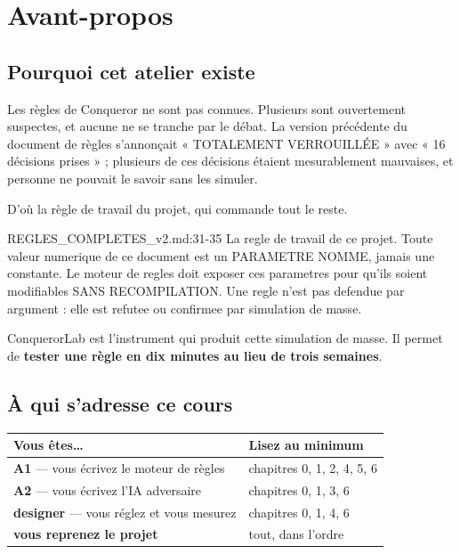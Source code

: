 \chapter{Avant-propos}

\section{Pourquoi cet atelier existe}

Les règles de Conqueror ne sont pas connues. Plusieurs sont ouvertement
suspectes, et aucune ne se tranche par le débat. La version précédente du
document de règles s'annonçait « TOTALEMENT VERROUILLÉE » avec « 16 décisions
prises » ; plusieurs de ces décisions étaient mesurablement mauvaises, et
personne ne pouvait le savoir sans les simuler.

D'où la règle de travail du projet, qui commande tout le reste.

\begin{nkcode}{REGLES\_COMPLETES\_v2.md:31-35}
La regle de travail de ce projet. Toute valeur numerique de ce document est
un PARAMETRE NOMME, jamais une constante. Le moteur de regles doit exposer
ces parametres pour qu'ils soient modifiables SANS RECOMPILATION. Une regle
n'est pas defendue par argument : elle est refutee ou confirmee par
simulation de masse.
\end{nkcode}

ConquerorLab est l'instrument qui produit cette simulation de masse. Il permet
de \textbf{tester une règle en dix minutes au lieu de trois semaines}.

\section{À qui s'adresse ce cours}

\begin{center}
\begin{tabular}{@{}p{6.4cm}p{7.4cm}@{}}
\toprule
\textbf{Vous êtes\ldots} & \textbf{Lisez au minimum} \\
\midrule
\textbf{A1} — vous écrivez le moteur de règles & chapitres 0, 1, 2, 4, 5, 6 \\
\textbf{A2} — vous écrivez l'IA adversaire & chapitres 0, 1, 3, 6 \\
\textbf{designer} — vous réglez et vous mesurez & chapitres 0, 1, 4, 6 \\
\textbf{vous reprenez le projet} & tout, dans l'ordre \\
\bottomrule
\end{tabular}
\end{center}

